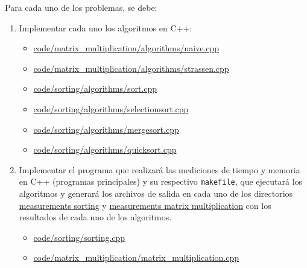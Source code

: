 Para cada uno de los problemas, se debe:
\begin{enumerate}[(1)]
    \item Implementar cada uno los algoritmos en C++:
    \begin{itemize}
        \item \href{https://github.com/pabloealvarez/INF221-2025-1-TAREA-1/blob/master/code/matrix_multiplication/algorithms/naive.cpp}{code/matrix\_multiplication/algorithms/naive.cpp}
        \item \href{https://github.com/pabloealvarez/INF221-2025-1-TAREA-1/blob/master/code/matrix_multiplication/algorithms/strassen.cpp}{code/matrix\_multiplication/algorithms/strassen.cpp}
        \item \href{https://github.com/pabloealvarez/INF221-2025-1-TAREA-1/blob/master/code/sorting/algorithms/sort.cpp}{code/sorting/algorithms/sort.cpp}
        \item \href{https://github.com/pabloealvarez/INF221-2025-1-TAREA-1/blob/master/code/sorting/algorithms/selectionsort.cpp}{code/sorting/algorithms/selectionsort.cpp}
        \item \href{https://github.com/pabloealvarez/INF221-2025-1-TAREA-1/blob/master/code/sorting/algorithms/mergesort.cpp}{code/sorting/algorithms/mergesort.cpp}
        \item \href{https://github.com/pabloealvarez/INF221-2025-1-TAREA-1/blob/master/code/sorting/algorithms/quicksort.cpp}{code/sorting/algorithms/quicksort.cpp}
    \end{itemize}
    \item Implementar el programa que realizará las mediciones de tiempo y memoria en C++ (programas principales) y su respectivo \texttt{makefile}, que ejecutará los algoritmos y generará los archivos de salida en cada uno de los directorios \href{https://github.com/pabloealvarez/INF221-2025-1-TAREA-1/blob/master/code/sorting/data/measurements/}{measurements sorting} y \href{https://github.com/pabloealvarez/INF221-2025-1-TAREA-1/blob/master/code/sortmatrix+multiplication/data/measurements/}{measurements matrix multiplication} con los resultados de cada uno de los algoritmos.
    \begin{itemize}
        \item \href{https://github.com/pabloealvarez/INF221-2025-1-TAREA-1/blob/master/code/sorting/sorting.cpp}{code/sorting/sorting.cpp}
        \item \href{https://github.com/pabloealvarez/INF221-2025-1-TAREA-1/blob/master/code/matrix_multiplication/matrix_multiplication.cpp}{code/matrix\_multiplication/matrix\_multiplication.cpp}
    \end{itemize}
    

\end{enumerate}
